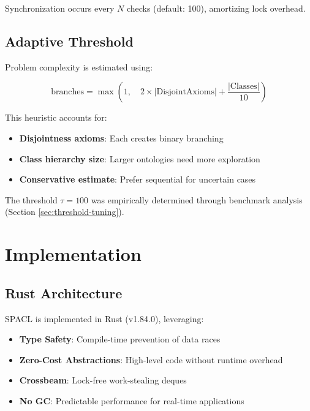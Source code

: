 \documentclass[preprint,12pt]{elsarticle}
\begin{document}
Synchronization occurs every $N$ checks (default: 100), amortizing lock overhead.

\subsection{Adaptive Threshold}
\label{sec:adaptive}

Problem complexity is estimated using:

\begin{equation}
\text{branches} = \max\left(1, \quad 2 \times |\text{DisjointAxioms}| + \frac{|\text{Classes}|}{10}\right)
\label{eq:estimate}
\end{equation}

This heuristic accounts for:
\begin{itemize}
    \item \textbf{Disjointness axioms}: Each creates binary branching
    \item \textbf{Class hierarchy size}: Larger ontologies need more exploration
    \item \textbf{Conservative estimate}: Prefer sequential for uncertain cases
\end{itemize}

The threshold $\tau = 100$ was empirically determined through benchmark analysis (Section \ref{sec:threshold-tuning}).

\section{Implementation}
\label{sec:implementation}

\subsection{Rust Architecture}
\label{sec:rust}

SPACL is implemented in Rust (v1.84.0), leveraging:

\begin{itemize}
    \item \textbf{Type Safety}: Compile-time prevention of data races
    \item \textbf{Zero-Cost Abstractions}: High-level code without runtime overhead
    \item \textbf{Crossbeam}: Lock-free work-stealing deques \cite{crossbeam}
    \item \textbf{No GC}: Predictable performance for real-time applications
\end{itemize}
\end{document}
